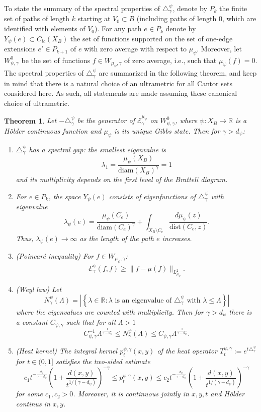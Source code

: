 \documentclass[12pt]{amsart}
\theoremstyle{plain}
\newtheorem{theorem}{Theorem}[section]
\theoremstyle{definition}
\begin{document}
To state the summary of the spectral properties of $\triangle_\gamma^\psi$, denote by $P_k$ the finite set of paths of length $k$ starting at $V_0\subset B$ (including paths of length 0, which are identified with elements of $V_0$). For any path $e\in P_k$ 
denote by $Y_\psi(e)\subset C_{lc}(X_B)$ the set of functions supported on the set of one-edge extensions $e'\in P_{k+1}$ of $e$ with zero average with respect to $\mu_\psi$. Moreover, let $W_{\psi,\gamma}^0$ be the set of functions $f\in W_{\mu_\psi,\gamma}$ of zero average, i.e., such that $\mu_\psi(f) = 0$. The spectral properties of $\triangle_\gamma^\psi$ are summarized in the following theorem, and keep in mind that there is a natural choice of an ultrametric for all Cantor sets considered here. As such, all statements are made assuming these canonical choice of ultrametric.
\begin{theorem}
\label{thm:spectrum}
Let $-\triangle_\gamma^\psi$ be the generator of $\mathcal{E}_\gamma^{\mu_\psi}$ on $W_{\psi,\gamma}^0$, where $\psi:X_B\rightarrow \mathbb{R}$ is a H\"older continuous function and $\mu_{\psi}$ is its unique Gibbs state. Then for $\gamma>d_\psi$:
\begin{enumerate}
    \item $\triangle_\gamma^\psi$ has a spectral gap: the smallest eigenvalue is
    $$\lambda_1 = \frac{\mu_\psi(X_B)}{\mathrm{diam}(X_B)^\gamma} = 1$$
    and its multiplicity depends on the first level of the Bratteli diagram.
    \item For $e\in P_k$, the space $Y_\psi(e)$ consists of eigenfunctions of $\triangle_\gamma^\psi$ with eigenvalue
    $$\lambda_\psi(e) = \frac{\mu_\psi(C_e)}{\mathrm{diam}(C_e)^\gamma} + \int_{X_B\setminus C_e} \frac{d\mu_\psi (z)}{\mathrm{dist}(C_e,z)}.$$
    Thus, $\lambda_\psi(e)\rightarrow \infty$ as the length of the path $e$ increases.
    \item (Poincar\'e inequality) For $f\in W_{\mu_\psi,\gamma}$:
    $$ \mathcal{E}_\gamma^\psi(f,f)\geq \|f-\mu(f)\|_{L^2_{\mu_\psi}}.$$
    \item (Weyl law) Let 
    $$N_\gamma^\psi(\Lambda) = |\left\{ \lambda\in\mathbb{R}: \lambda\mbox{ is an eigenvalue of }\triangle_\gamma^\psi \mbox{ with }\lambda\leq \Lambda\right\}|$$
    where the eigenvalues are counted with multiplicity. Then for $\gamma>d_\psi$ there is a constant $C_{\psi, \gamma}$ such that for all $\Lambda>1$
        $$C^{-1}_{\psi, \gamma} \Lambda^{\frac{1}{\gamma - d_\psi}}\leq  N_\gamma^\psi(\Lambda)\leq C_{\psi,\gamma} \Lambda^{\frac{1}{\gamma - d_\psi}}.$$
    \item (Heat kernel) The integral kernel $p_t^{\psi,\gamma}(x,y)$ of the heat operator $T_t^{\psi,\gamma}:=e^{t\triangle_\gamma^\psi}$ for $t\in (0,1]$ satisfies the two-sided estimate
$$c_1 t^{-\frac{d_\psi}{\gamma-d_\psi}}\left(1+\frac{d(x,y)}{t^{1/(\gamma-d_\psi)}}\right)^{-\gamma}\leq p_t^{\psi,\gamma}(x,y) \leq    c_2 t^{-\frac{d_\psi}{\gamma-d_\psi}}\left(1+\frac{d(x,y)}{t^{1/(\gamma-d_\psi)}}\right)^{-\gamma}$$
for some $c_1,c_2>0$. Moreover, it is continuous jointly in $x,y,t$ and H\"older continus in $x,y$.
    \end{enumerate}
\end{theorem}
\end{document}
